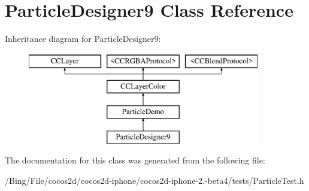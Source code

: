 \hypertarget{interface_particle_designer9}{\section{Particle\-Designer9 Class Reference}
\label{interface_particle_designer9}
}
Inheritance diagram for Particle\-Designer9\-:\begin{figure}[H]
\begin{center}
\leavevmode
\includegraphics[height=4.000000cm]{interface_particle_designer9}
\end{center}
\end{figure}


The documentation for this class was generated from the following file\-:\begin{DoxyCompactItemize}
\item 
/\-Bing/\-File/cocos2d/cocos2d-\/iphone/cocos2d-\/iphone-\/2.-\/beta4/tests/Particle\-Test.\-h\end{DoxyCompactItemize}
